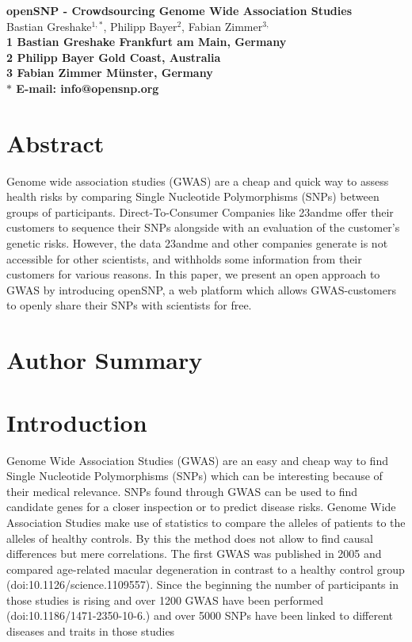 \documentclass[10pt]{article}
\date{}
\begin{document}
\begin{flushleft}
{\Large
\textbf{openSNP - Crowdsourcing Genome Wide Association Studies}
}
\\
Bastian Greshake$^{1,\ast}$, 
Philipp Bayer$^{2}$, 
Fabian Zimmer$^{3,}$
\\
\bf{1} Bastian Greshake Frankfurt am Main, Germany
\\
\bf{2} Philipp Bayer Gold Coast, Australia
\\
\bf{3} Fabian Zimmer M\"unster, Germany
\\
$\ast$ E-mail: info@opensnp.org
\end{flushleft}

\section*{Abstract}
Genome wide association studies (GWAS) are a cheap and quick way to assess health risks by comparing Single Nucleotide Polymorphisms (SNPs) between groups of participants. Direct-To-Consumer Companies like 23andme offer their customers to sequence their SNPs alongside with an evaluation of the customer's genetic risks. However, the data 23andme and other companies generate is not accessible for other scientists, and withholds some information from their customers for various reasons. In this paper, we present an open approach to GWAS by introducing openSNP, a web platform which allows GWAS-customers to openly share their SNPs with scientists for free.  %


\section*{Author Summary}

\section*{Introduction}

Genome Wide Association Studies (GWAS) are an easy and cheap way to find Single Nucleotide Polymorphisms (SNPs) which can be interesting because of their medical relevance. SNPs found through GWAS can be used to find candidate genes for a closer inspection or to predict disease risks. Genome Wide Association Studies make use of statistics to compare the alleles of patients to the alleles of healthy controls. By this the method does not allow to find causal differences but mere correlations. The first GWAS was published in 2005 and compared age-related macular degeneration in contrast to a healthy control group (doi:10.1126/science.1109557). Since the beginning the number of participants in those studies is rising and over 1200 GWAS have been performed (doi:10.1186/1471-2350-10-6.) and over 5000 SNPs have been linked to different diseases and traits in those studies %
\end{document}
